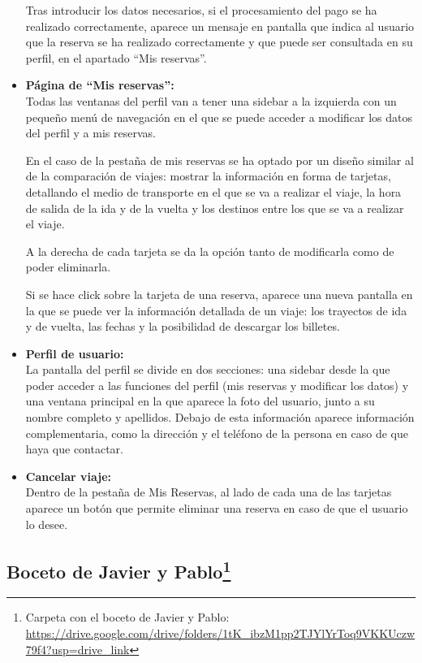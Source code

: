 \begin{itemize}
            Tras introducir los datos necesarios, si el procesamiento del pago se ha
            realizado correctamente, aparece un mensaje en pantalla que indica al usuario
            que la reserva se ha realizado correctamente y que puede ser consultada en su
            perfil, en el apartado “Mis reservas”.

      \item\textbf{Página de ``Mis reservas'':} \\ Todas las ventanas del perfil van a tener una sidebar a la izquierda con un pequeño menú de navegación en el que se puede acceder a modificar los datos del perfil y a mis reservas.

            En el caso de la pestaña de mis reservas se ha optado por un diseño similar al
            de la comparación de viajes: mostrar la información en forma de tarjetas,
            detallando el medio de transporte en el que se va a realizar el viaje, la hora
            de salida de la ida y de la vuelta y los destinos entre los que se va a
            realizar el viaje.

            A la derecha de cada tarjeta se da la opción tanto de modificarla como de poder
            eliminarla.

            Si se hace click sobre la tarjeta de una reserva, aparece una nueva pantalla en
            la que se puede ver la información detallada de un viaje: los trayectos de ida
            y de vuelta, las fechas y la posibilidad de descargar los billetes.

      \item\textbf{Perfil de usuario:} \\ La pantalla del perfil se divide en dos secciones: una sidebar desde la que poder acceder a las funciones del perfil (mis reservas y modificar los datos) y una ventana principal en la que aparece la foto del usuario, junto a su nombre completo y apellidos. Debajo de esta información aparece información complementaria, como la dirección y el teléfono de la persona en caso de que haya que contactar.
      \item\textbf{Cancelar viaje:} \\ Dentro de la pestaña de Mis Reservas, al lado de cada una de las tarjetas aparece un botón que permite eliminar una reserva en caso de que el usuario lo desee.
\end{itemize}

\subsection[Boceto de Javier y Pablo]{Boceto de Javier y Pablo\footnote{Carpeta con el boceto de Javier y Pablo: \url{https://drive.google.com/drive/folders/1tK_ibzM1pp2TJYlYrToq9VKKUczw79f4?usp=drive_link}}}

